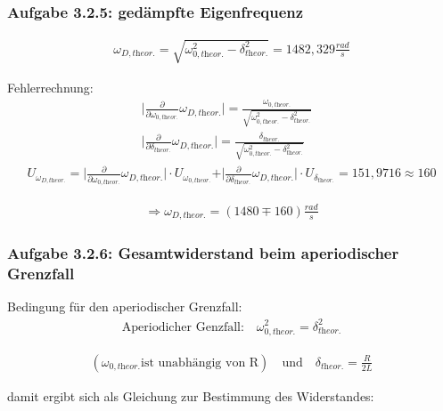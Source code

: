 \documentclass[a4paper]{scrartcl}
\numberwithin{equation}{subsection}
\begin{document}
\subsubsection{Aufgabe 3.2.5: gedämpfte Eigenfrequenz}

\begin{align}
\omega_{D,\textit{theor.}} = \sqrt{\omega_{0,\textit{theor.}}^2 - \delta_{\textit{theor.}}^2} = 1482,329 \frac{rad}{s}
\end{align}

Fehlerrechnung:
\begin{align*}
\vert \frac{\partial}{\partial \omega_{0,\textit{theor.}}}\omega_{D,\textit{theor.}}\vert = \frac{\omega_{0,\textit{theor.}}}{\sqrt{\omega_{0,\textit{theor.}}^2 - \delta_{\textit{theor.}}^2}} &\\
\vert \frac{\partial}{\partial \delta_{\textit{theor.}}}\omega_{D,\textit{theor.}}\vert = \frac{\delta_{\textit{theor.}}}{\sqrt{\omega_{0,\textit{theor.}}^2 - \delta_{\textit{theor.}}^2}} &
\end{align*}
\begin{align*}
U_{\omega_{D,\textit{theor.}}} = \vert \frac{\partial}{\partial \omega_{0,\textit{theor.}}}\omega_{D,\textit{theor.}}\vert \cdot U_{\omega_{0,\textit{theor.}}} + \vert \frac{\partial}{\partial \delta_{\textit{theor.}}}\omega_{D,\textit{theor.}}\vert \cdot U_{\delta_{\textit{theor.}}} = 151,9716 \approx 160
\end{align*}

\begin{align*}
\Rightarrow \omega_{D,\textit{theor.}} = (1480 \mp 160) \frac{rad}{s}
\end{align*}

\subsubsection{Aufgabe 3.2.6: Gesamtwiderstand beim aperiodischer Grenzfall}

Bedingung für den aperiodischer Grenzfall:
\begin{align}
\text{Aperiodicher Genzfall:} \quad \omega_{0,\textit{theor.}}^2 = \delta_{\textit{theor.}}^2
\end{align}

\begin{align*}
(\omega_{0,\textit{theor.}} \text{ist unabhängig von R}) \quad \text{und} \quad
\delta_{\textit{theor.}} = \frac{R}{2L}
\end{align*}

damit ergibt sich als Gleichung zur Bestimmung des Widerstandes:
\end{document}

